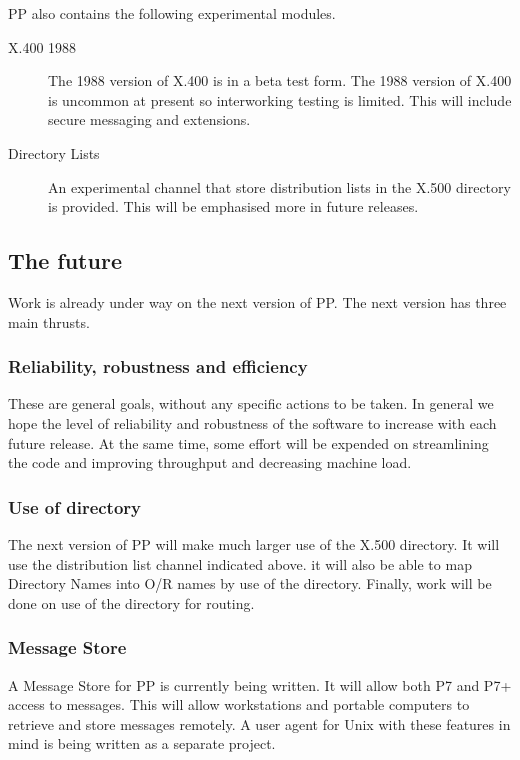 PP also contains the following experimental modules.
\begin{description}
\item[X.400 1988]	The 1988 version of X.400 is in a beta test
form. The 1988 version of X.400 is uncommon at present so interworking
testing is limited. This will include secure messaging and extensions.

\item[Directory Lists] An experimental channel that store distribution
lists in the X.500 directory is provided. This will be emphasised more
in future releases.

\end{description}

\subsection{The future}
Work is already under way on the next version of PP. The next version
has three main thrusts.

\subsubsection {Reliability, robustness and efficiency}
These are general goals, without any specific actions to be taken. In
general we hope the level of reliability and robustness of the
software to increase with each future release. At the same time, some
effort will be expended on streamlining the code and improving
throughput and decreasing machine load.

\subsubsection {Use of directory}
The next version of PP will make much larger use of the X.500
directory. It will use the distribution list channel indicated above.
it will also be able to map Directory Names into O/R names by use of
the directory. Finally, work will be done on use of the directory for
routing. 

\subsubsection{Message Store}
A Message Store for PP is currently being written. It will allow
both P7 and P7+ access to messages. This will allow workstations and
portable computers to retrieve and store messages remotely. A user
agent for Unix with these features in mind is being written as a
separate project.




\showsummary


